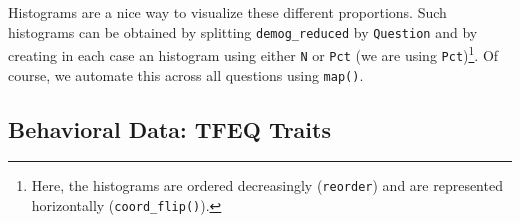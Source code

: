 \documentclass[
]{book}
\newenvironment{Shaded}{\begin{snugshade}}{\end{snugshade}}
\newcommand{\AttributeTok}[1]{\textcolor[rgb]{0.77,0.63,0.00}{#1}}
\newcommand{\ControlFlowTok}[1]{\textcolor[rgb]{0.13,0.29,0.53}{\textbf{#1}}}
\newcommand{\DecValTok}[1]{\textcolor[rgb]{0.00,0.00,0.81}{#1}}
\newcommand{\FunctionTok}[1]{\textcolor[rgb]{0.00,0.00,0.00}{#1}}
\newcommand{\NormalTok}[1]{#1}
\newcommand{\OtherTok}[1]{\textcolor[rgb]{0.56,0.35,0.01}{#1}}
\newcommand{\SpecialCharTok}[1]{\textcolor[rgb]{0.00,0.00,0.00}{#1}}
\newcommand{\StringTok}[1]{\textcolor[rgb]{0.31,0.60,0.02}{#1}}
\begin{document}
Histograms are a nice way to visualize these different proportions. Such histograms can be obtained by splitting \texttt{demog\_reduced} by \texttt{Question} and by creating in each case an histogram using either \texttt{N} or \texttt{Pct} (we are using \texttt{Pct})\footnote{Here, the histograms are ordered decreasingly (\texttt{reorder}) and are represented horizontally (\texttt{coord\_flip()}).}. Of course, we automate this across all questions using \texttt{map()}.

\begin{Shaded}
\end{Shaded}

\hypertarget{behavioral-data-tfeq-traits}{%
\subsection{Behavioral Data: TFEQ Traits}\label{behavioral-data-tfeq-traits}}
\end{document}
